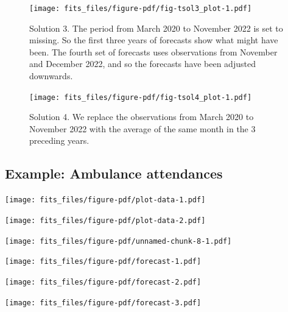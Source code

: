 \documentclass[11pt,a4paper,]{article}
\begin{document}
\begin{figure}

{\centering \texttt{[image: fits\_files/figure-pdf/fig-tsol3\_plot-1.pdf]}

}

\caption{\label{fig-tsol3_plot}Solution 3. The period from March 2020 to
November 2022 is set to missing. So the first three years of forecasts
show what might have been. The fourth set of forecasts uses observations
from November and December 2022, and so the forecasts have been adjusted
downwards.}

\end{figure}

\begin{figure}

{\centering \texttt{[image: fits\_files/figure-pdf/fig-tsol4\_plot-1.pdf]}

}

\caption{\label{fig-tsol4_plot}Solution 4. We replace the observations
from March 2020 to November 2022 with the average of the same month in
the 3 preceding years.}

\end{figure}

\FloatBarrier

\hypertarget{example-ambulance-attendances}{%
\subsection{Example: Ambulance
attendances}\label{example-ambulance-attendances}}

\texttt{[image: fits\_files/figure-pdf/plot-data-1.pdf]}

\texttt{[image: fits\_files/figure-pdf/plot-data-2.pdf]}

\texttt{[image: fits\_files/figure-pdf/unnamed-chunk-8-1.pdf]}

\texttt{[image: fits\_files/figure-pdf/forecast-1.pdf]}

\texttt{[image: fits\_files/figure-pdf/forecast-2.pdf]}

\texttt{[image: fits\_files/figure-pdf/forecast-3.pdf]}

\printbibliography
\end{document}
